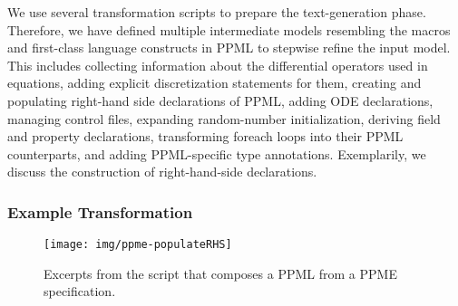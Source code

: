 We use several transformation scripts to prepare the text-generation phase.
Therefore, we have defined multiple intermediate models resembling the macros and
first-class language constructs in PPML to stepwise refine the input model. This
includes collecting information about the differential operators used in equations,
adding explicit discretization statements for them, creating and populating right-hand side
declarations of PPML, adding ODE declarations, managing control files, expanding
random-number initialization, deriving field and property declarations, transforming
foreach loops into their PPML counterparts, and adding PPML-specific type annotations.
%
Exemplarily, we discuss the construction of right-hand-side declarations.

\subsubsection{Example Transformation}
%


\begin{figure}[t]
  \texttt{[image: img/ppme-populateRHS]}
  \caption{Excerpts from the script that composes a PPML  from a PPME  specification.}
  \label{fig:ppme-populateRHS}
\end{figure}

